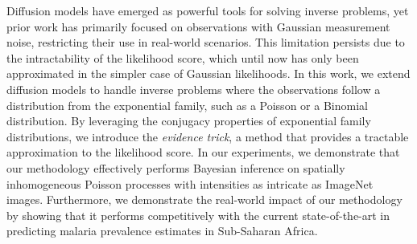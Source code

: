 Diffusion models have emerged as powerful tools for solving inverse problems, yet prior work has primarily focused on observations with Gaussian measurement noise, restricting their use in real-world scenarios.
This limitation persists due to the intractability of the likelihood score, which until now has only been approximated in the simpler case of Gaussian likelihoods.
In this work, we extend diffusion models to handle inverse problems where the observations follow a distribution from the exponential family, such as a Poisson or a Binomial distribution. 
By leveraging the conjugacy properties of exponential family distributions, we introduce the \textit{evidence trick}, a method that provides a tractable approximation to the likelihood score.
In our experiments, we demonstrate that our methodology effectively performs Bayesian inference on spatially inhomogeneous Poisson processes with intensities as intricate as ImageNet images. Furthermore, we demonstrate the real-world impact of our methodology by showing that it performs competitively with the current state-of-the-art in predicting malaria prevalence estimates in Sub-Saharan Africa.






